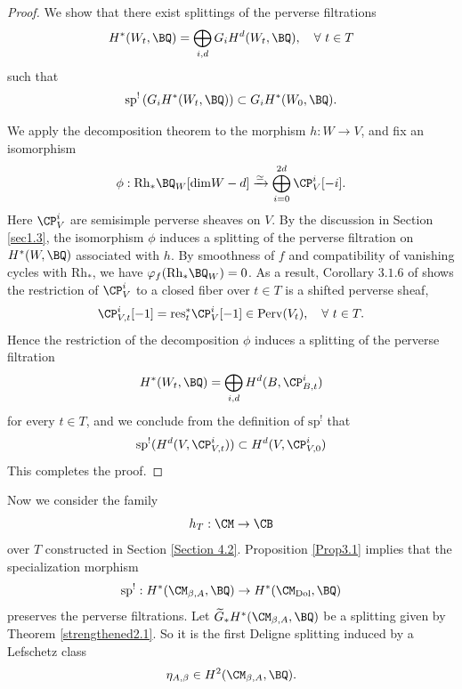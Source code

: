 \begin{proof}
We show that there exist splittings of the perverse filtrations
\[
H^*(W_t, \BQ) = \bigoplus_{i,d}G_iH^d(W_t, \BQ), \quad \forall~ t \in T
\]
such that
\begin{equation*}
\mathrm{sp}^!\left(G_iH^*(W_t ,\BQ)\right) \subset G_iH^*(W_0, \BQ).
\end{equation*}

We apply the decomposition theorem \cite{BBD} to the morphism $h: W \to V$, and fix an isomorphism
\[
\phi: \mathrm{Rh}_\ast \BQ_W [\mathrm{dim}W - d] \xrightarrow{\simeq} \bigoplus_{i=0}^{2d} \CP_V^i [-i].
\]
Here $\CP_V^i$ are semisimple perverse sheaves on $V$. By the discussion in Section \ref{sec1.3}, the isomorphism $\phi$ induces a splitting of the perverse filtration on $H^*(W, \BQ)$ associated with $h$. By smoothness of $f$ and compatibility of vanishing cycles with $\mathrm{Rh}_*$, we have $\varphi_f(\mathrm{Rh}_\ast \BQ_W) = 0$.  As a result, Corollary $3.1.6$ of \cite{dCM} shows the restriction of $\CP_V^i$ to a closed fiber over $t\in T$ is a shifted perverse sheaf,
\[
\CP_{V,t}^i [-1] = \mathrm{res}_t^*\CP_V^i [-1] \in \mathrm{Perv}(V_t), \quad \forall~ t\in T.
\]
Hence the restriction of the decomposition $\phi$ induces a splitting of the perverse filtration
\[
H^*(W_t, \BQ) = \bigoplus_{i,d}H^d(B, \CP_{B,t}^i)
\]
for every $t\in T$, and we conclude from the definition of $\mathrm{sp}^!$ that
\[
\mathrm{sp}^! (H^d(V, \CP_{V,t}^i)) \subset H^d(V, \CP_{V,0}^i)
\]
This completes the proof.
\end{proof}

Now we consider the family
\[
h_T: \CM \to  \CB
\]
over $T$ constructed in Section \ref{Section 4.2}. Proposition \ref{Prop3.1} implies that the specialization morphism
\[
\mathrm{sp}^!: H^*(\CM_{\beta, A}, \BQ) \to H^*(\CM_{\mathrm{Dol}}, \BQ)
\]
preserves the perverse filtrations. Let $\widetilde{G}_*H^*(\CM_{\beta,A}, \BQ)$ be a splitting given by Theorem \ref{strengthened2.1}. So it is the first Deligne splitting induced by a Lefschetz class
\[
\eta_{A,\beta} \in H^2(\CM_{\beta,A}, \BQ).
\]

